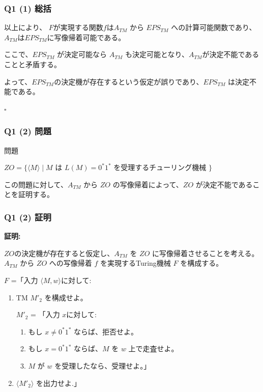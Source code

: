 \begin{frame}[fragile]
\frametitle{Q1 (1) 総括}

以上により、
$F$が実現する関数$f$は$A_{TM}$ から $EPS_{TM}$ への計算可能関数であり、$A_{TM}$は$EPS_{TM}$に写像帰着可能である。

ここで、$EPS_{TM}$ が決定可能なら $A_{TM}$ も決定可能となり、$A_{TM}$が決定不能であることと矛盾する。  

よって、$EPS_{TM}$の決定機が存在するという仮定が誤りであり、$EPS_{TM}$ は決定不能である。

\hfill $\square$


\end{frame}


\begin{frame}[fragile]
\frametitle{Q1 (2) 問題}

\begin{alertblock}{問題}

$ZO = \{\langle M \rangle \mid M \text{ は } L(M) = 0^*1^* \text{ を受理するチューリング機械 } \}$

\end{alertblock}
この問題に対して、$A_{TM}$ から $ZO$ の写像帰着によって、$ZO$ が決定不能であることを証明する。

\end{frame}

\begin{frame}[fragile]
\frametitle{Q1 (2) 証明}

\textbf{証明:}

$ZO$の決定機が存在すると仮定し、$A_{TM}$ を $ZO$ に写像帰着させることを考える。
$A_{TM}$ から $ZO$ への写像帰着 $f$ を実現するTuring機械 $F$ を構成する。

$F$ =「入力 $\langle M, w  \rangle$に対して:

\begin{enumerate}
    \item TM $M'_2$ を構成せよ。

     $M'_2$ = 「入力 $x$に対して:

    \begin{enumerate}
        \item[1.] もし $x  \neq 0^*1^*$ ならば、拒否せよ。
        \item[2.] もし $x = 0^*1^*$ ならば、$M$ を $w$ 上で走査せよ。
        \item[3.] $M$ が $w$ を受理したなら、受理せよ。」
    \end{enumerate}

    \item $\langle M'_2 \rangle$ を出力せよ.」
\end{enumerate}

\end{frame}

